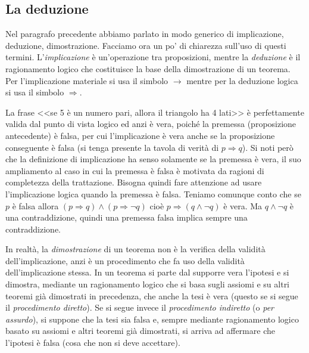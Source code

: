 \subsection{La deduzione}

Nel paragrafo precedente abbiamo parlato in modo generico di implicazione, deduzione, dimostrazione. Facciamo ora un po' di chiarezza sull'uso di questi termini. L'\emph{implicazione} è un'operazione tra proposizioni, mentre la \emph{deduzione} è il ragionamento logico che costituisce la base della dimostrazione di un teorema. Per l'implicazione materiale si usa il simbolo $\rightarrow$ mentre per la deduzione logica si usa il simbolo $\Rightarrow$.

La frase <<se 5 è un numero pari, allora il triangolo ha 4 lati>> è perfettamente valida dal punto di vista logico ed anzi è vera, poiché la premessa (proposizione antecedente) è falsa, per cui l'implicazione è vera anche se la proposizione conseguente è falsa (si tenga presente la tavola di verità di $p\Rightarrow q$).
Si noti però che la definizione di implicazione ha senso solamente se la premessa è vera, il suo ampliamento al caso in cui la premessa è falsa è motivata da ragioni di completezza della trattazione. Bisogna quindi fare attenzione ad usare l'implicazione logica quando la premessa è falsa. Teniamo comunque conto che se $p$ è falsa allora $(p\Rightarrow q)\wedge(p\Rightarrow \neg q)$ cioè $p\Rightarrow (q\wedge \neg q)$ è vera. Ma  $q\wedge \neg q$ è una contraddizione, quindi una premessa falsa implica sempre una contraddizione.

In realtà, la \emph{dimostrazione} di un teorema non è la verifica della validità dell'implicazione, anzi è un procedimento che fa uso della validità dell'implicazione stessa. In un teorema si parte dal supporre vera l'ipotesi e si dimostra, mediante un ragionamento logico che si basa sugli assiomi e su altri teoremi già dimostrati in precedenza, che anche la tesi è vera (questo se si segue il \emph{procedimento diretto}). Se si segue invece il \emph{procedimento indiretto} (o \emph{per assurdo}), si suppone che la tesi sia falsa e, sempre mediante ragionamento logico basato su assiomi e altri teoremi già dimostrati, si arriva ad affermare che l'ipotesi è falsa (cosa che non si deve accettare).

